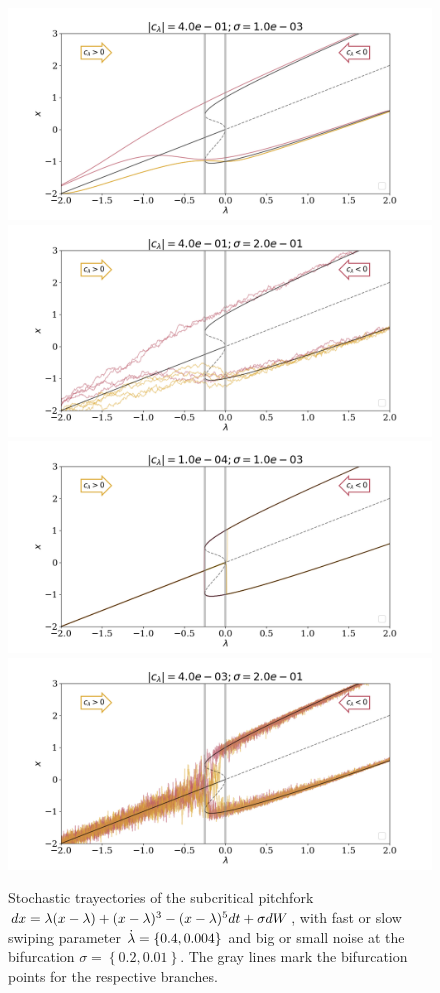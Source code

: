 \begin{figure}[htbp]
	\includegraphics[width=0.49\linewidth]{Images/Metrics/spectrum_cases/slanted_subpitch_fast}
	\includegraphics[width=0.49\linewidth]{Images/Metrics/spectrum_cases/slanted_subpitch_fastnoise}\\
	\includegraphics[width=0.49\linewidth]{Images/Metrics/spectrum_cases/slanted_subpitch_adiab}
	\includegraphics[width=0.49\linewidth]{Images/Metrics/spectrum_cases/slanted_subpitch_noise}
	\caption{Stochastic trayectories of the subcritical pitchfork $dx=\lambda (x-\lambda)+(x-\lambda)^3-(x-\lambda)^5 dt+\sigma dW$, with fast or slow swiping parameter $\dot{\lambda}=\left\{0.4,0.004\right\}$ and big or small noise at the bifurcation $\sigma=\left\{0.2,0.01\right\}$. The gray lines mark the bifurcation points for the respective branches.}
	\label{fig: cases}
\end{figure}







